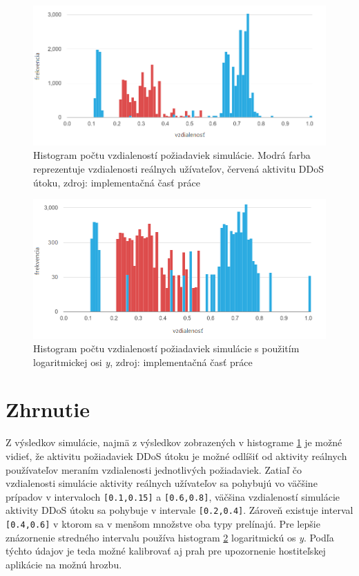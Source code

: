 \documentclass[
  printed, %
  table,   %
  lof,     %
  nolot,   %
  nocover
]{fithesis3}
\begin{document}
\begin{figure}[h]
  \centering
    \includegraphics[width=\textwidth]{images/data-histogram-new.png}
  \caption{Histogram počtu vzdialeností požiadaviek simulácie. Modrá farba
  reprezentuje vzdialenosti reálnych užívateľov, červená aktivitu DDoS útoku,
  zdroj: implementačná časť práce}
  \label{fig:data-histogram}
\end{figure}

\begin{figure}[h]
  \centering
    \includegraphics[width=\textwidth]{images/data-histogram-log-new.png}
  \caption{Histogram počtu vzdialeností požiadaviek simulácie s použitím logaritmickej
  osi \textit{y}, zdroj: implementačná časť práce}
  \label{fig:data-histogram-log}
\end{figure}

\section{Zhrnutie}
Z výsledkov simulácie, najmä z výsledkov zobrazených v histograme
\ref{fig:data-histogram} je možné vidieť, že aktivitu požiadaviek DDoS útoku je
možné odlíšiť od aktivity reálnych používateľov meraním vzdialenosti
jednotlivých požiadaviek. Zatiaľ čo vzdialenosti simulácie aktivity reálnych
užívateľov sa pohybujú vo väčšine prípadov v intervaloch \texttt{[0.1,0.15]} a \texttt{[0.6,0.8]},
väčšina vzdialeností simulácie aktivity DDoS útoku sa pohybuje v intervale
\texttt{[0.2,0.4]}. Zároveň existuje interval \texttt{[0.4,0.6]} v ktorom sa v menšom
množstve oba typy prelínajú. Pre lepšie znázornenie stredného intervalu používa
histogram \ref{fig:data-histogram-log} logaritmickú os \textit{y}.
Podľa týchto údajov je teda možné kalibrovať aj prah pre
upozornenie hostiteľskej aplikácie na možnú hrozbu. 
\end{document}
